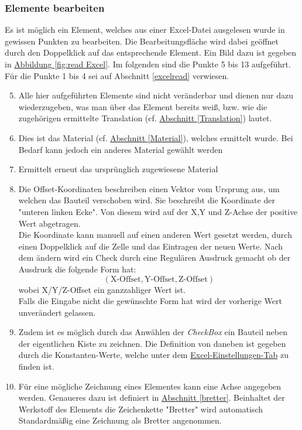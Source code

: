 \documentclass{book}
\begin{document}
			\subsubsection{Elemente bearbeiten} \label{element bearbeiten}
				Es ist möglich ein Element, welches aus einer Excel-Datei ausgelesen wurde in gewissen Punkten zu bearbeiten. Die Bearbeitungsfläche wird dabei geöffnet durch den Doppelklick auf das entsprechende Element. Ein Bild dazu ist gegeben in \hyperref[fig:read Excel]{Abbildung \ref{fig:read Excel}}. Im folgenden sind die Punkte 5 bis 13 aufgeführt. Für die Punkte 1 bis 4 sei auf Abschnitt \ref{excelread} verwiesen.				
				\begin{enumerate}
					\setcounter{enumi}{4}
					\item Alle hier aufgeführten Elemente sind nicht veränderbar und dienen nur dazu wiederzugeben, was man über das Element bereits weiß, bzw. wie die zugehörigen ermittelte Translation (cf. \hyperref[Translation]{Abschnitt \ref{Translation}}) lautet.
					\item Dies ist das Material (cf. \hyperref[Material]{Abschnitt \ref{Material}}), welches ermittelt wurde. Bei Bedarf kann jedoch ein anderes Material gewählt werden
					\item Ermittelt erneut das ursprünglich zugewiesene Material
					\item Die Offset-Koordinaten beschreiben einen Vektor vom Ursprung aus, um welchen das Bauteil verschoben wird. Sie beschreibt die Koordinate der "unteren linken Ecke". Von diesem wird auf der X,Y und Z-Achse der positive Wert abgetragen.\\
					Die Koordinate kann manuell auf einen anderen Wert gesetzt werden, durch einen Doppelklick auf die Zelle und das Eintragen der neuen Werte. Nach dem ändern wird ein Check durch eine Regulären Ausdruck gemacht ob der Ausdruck die folgende Form hat:
					$$ ( \text{X-Offset}, \text{Y-Offset}, \text{Z-Offset})$$
					wobei X/Y/Z-Offset ein ganzzahliger Wert ist.\\
					Falls die Eingabe nicht die gewünschte Form hat wird der vorherige Wert unverändert gelassen.\\
					\item Zudem ist es möglich durch das Anwählen der \textit{CheckBox} ein Bauteil neben der eigentlichen Kiste zu zeichnen. Die Definition von \glqq daneben \grqq ist gegeben durch die Konstanten-Werte, welche unter dem \hyperref[excel konstanten]{Excel-Einstellungen-Tab} zu finden ist. 
					\item Für eine mögliche Zeichnung eines Elementes kann eine Achse angegeben werden. Genaueres dazu ist definiert in \hyperref[bretter]{Abschnitt \ref{bretter}}. Beinhaltet der Werkstoff des Elements die Zeichenkette "Bretter" wird automatisch Standardmäßig eine Zeichnung als Bretter angenommen. 

\end{enumerate}
\end{document}
